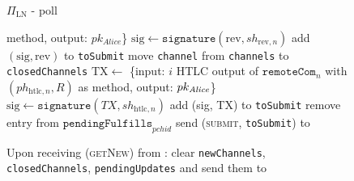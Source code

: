 \begin{figure}[H]
\begin{protocolbox}{$\Pi_{\mathrm{LN}}$ - poll}
\begin{algorithmic}[1]
              method, output: $pk_{\mathit{Alice}}$\}
              \State $\mathrm{sig} \gets \mathtt{signature}\left(\mathrm{rev},
              sh_{\mathrm{rev}, n}\right)$
              \State add $\left(\mathrm{sig}, \mathrm{rev}\right)$ to
              \texttt{toSubmit}
            \EndIf
            \State move \texttt{channel} from \texttt{channels} to
            \texttt{closedChannels}
          \EndFor
                \State $\mathrm{TX} \gets$ \{input: $i$ HTLC output of
                $\mathtt{remoteCom}_n$ with $\left(ph_{\mathrm{htlc}, n},
                R\right)$ as method, output: $pk_{\mathit{Alice}}$\}
                \State $\mathrm{sig} \gets \mathtt{signature}\left(TX,
                sh_{\mathrm{htlc}, n}\right)$
                \State add (sig, TX) to \texttt{toSubmit}
                \State remove entry from
                $\mathtt{pendingFulfills}_{\mathit{pchid}}$
              \EndIf
            \EndFor
          \EndFor
          \State send (\textsc{submit}, \texttt{toSubmit}) to \ledger
        \EndIndent
        \Statex

        \State Upon receiving (\textsc{getNew}) from \alice:
        \Indent
          \State clear \texttt{newChannels}, \texttt{closedChannels},
          \texttt{pendingUpdates} and send them to \alice
        \EndIndent
      \end{algorithmic}
    \end{protocolbox}
    \caption{}
    \label{alg:protocol:poll}
  \end{figure}

